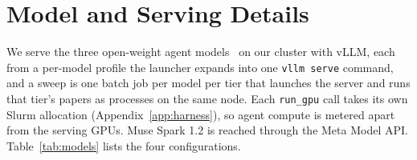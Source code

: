 \section{Model and Serving Details}
\label{app:models}

We serve the three open-weight agent
models~\citep{deepseekai2026flashcard,qwen2026fp8card,cyankiwi2026minimaxawq,lin2023awq} on our cluster with vLLM, each from
a per-model profile the launcher expands into one \texttt{vllm serve} command,
and a sweep is one batch job per model per tier that launches the server and
runs that tier's papers as processes on the same node. Each \texttt{run\_gpu}
call takes its own Slurm allocation (Appendix~\ref{app:harness}), so agent
compute is metered apart from the serving GPUs. Muse Spark 1.2 is reached
through the Meta Model API.
Table~\ref{tab:models} lists the four configurations.

